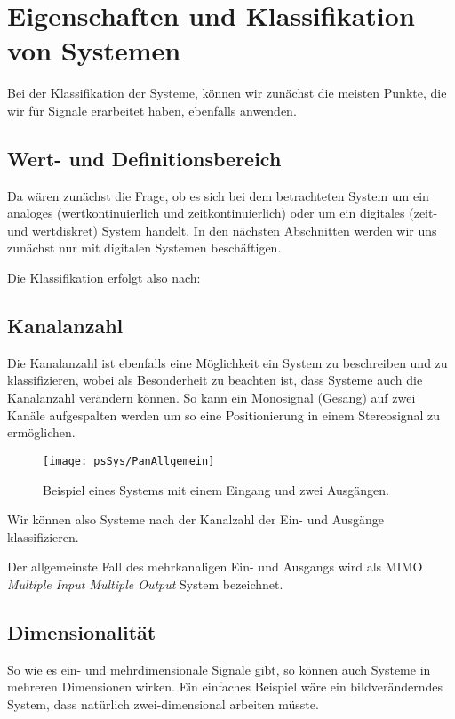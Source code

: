 \section{Eigenschaften und Klassifikation von Systemen}
Bei der Klassifikation der Systeme, können wir zunächst die
meisten Punkte, die wir für Signale erarbeitet haben, ebenfalls
anwenden.
\subsection{Wert- und Definitionsbereich}
Da wären zunächst die Frage, ob es sich bei dem betrachteten
System um ein analoges (wertkontinuierlich und zeitkontinuierlich)
oder um ein digitales (zeit- und wertdiskret) System  handelt. In
den nächsten Abschnitten werden wir uns zunächst nur mit digitalen
Systemen beschäftigen.

Die Klassifikation erfolgt also nach:


\subsection{Kanalanzahl}
Die Kanalanzahl ist ebenfalls eine Möglichkeit ein System zu
beschreiben und zu klassifizieren, wobei als Besonderheit zu
beachten ist, dass Systeme auch die Kanalanzahl verändern können.
So kann \zB ein Monosignal (Gesang) auf zwei Kanäle aufgespalten
werden um so eine Positionierung in einem Stereosignal zu
ermöglichen.

\begin{figure}[H]
\begin{center}
\texttt{[image: psSys/PanAllgemein]}
\caption{\label{pic:PanAlgo} Beispiel eines Systems mit einem
Eingang und zwei Ausgängen.}
\end{center}
\end{figure}

Wir können also Systeme nach der Kanalzahl der Ein- und Ausgänge
klassifizieren.


Der allgemeinste Fall des mehrkanaligen Ein- und Ausgangs wird
als MIMO {\em Multiple Input Multiple Output} System bezeichnet.

\subsection{Dimensionalität}
So wie es ein- und mehrdimensionale Signale gibt, so können auch
Systeme in mehreren Dimensionen wirken. Ein einfaches Beispiel
wäre ein bildveränderndes System, dass natürlich zwei-dimensional
arbeiten müsste.

